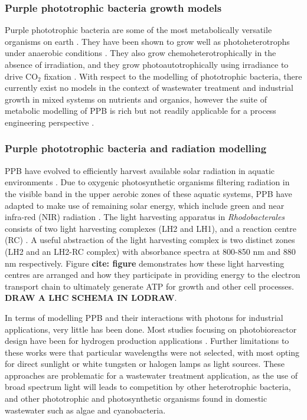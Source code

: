 \subsubsection{Purple phototrophic bacteria growth models}
Purple phototrophic bacteria are some of the most metabolically versatile organisms on earth \cite{Hunter2008}. They have been shown to grow well as photoheterotrophs under anaerobic conditions \cite{Hulsen2014}. They also grow chemoheterotrophically in the absence of irradiation, and they grow photoautotrophically using irradiance to drive $\mathrm{CO_2}$ fixation \cite{Gordon2014}. With respect to the modelling of phototrophic bacteria, there currently exist no models in the context of wastewater treatment and industrial growth in mixed systems on nutrients and organics, however the suite of metabolic modelling of PPB is rich but not readily applicable for a process engineering perspective \cite{Klamt2002}.

\subsubsection{Purple phototrophic bacteria and radiation modelling}
PPB have evolved to efficiently harvest available solar radiation in aquatic environments \cite{Cogdell2006a}. Due to oxygenic photosynthetic organisms filtering radiation in the visible band in the upper aerobic zones of these aquatic systems, PPB have adapted to make use of remaining solar energy, which include green and near infra-red (NIR) radiation \cite{Cogdell2006a}. The light harvesting apparatus in \textit{Rhodobacterales} consists of two light harvesting complexes (LH2 and LH1), and a reaction centre (RC) \cite{Hellingwerf1994}. A useful abstraction of the light harvesting complex is two distinct zones (LH2 and an LH2-RC complex) with absorbance spectra at 800-850 \si{nm} and 880 \si{nm} respectively. Figure \textbf{cite: figure} demonstrates how these light harvesting centres are arranged and how they participate in providing energy to the electron transport chain to ultimately generate ATP for growth and other cell processes. \textbf{DRAW A LHC SCHEMA IN LODRAW}.

In terms of modelling PPB and their interactions with photons for industrial applications, very little has been done. Most studies focusing on photobioreactor design have been for hydrogen production applications \cite{Adessi2014, Krujatz2015}. Further limitations to these works were that particular wavelengths were not selected, with most opting for direct sunlight or white tungsten or halogen lamps as light sources. These approaches are problematic for a wastewater treatment application, as the use of broad spectrum light will leads to competition by other heterotrophic bacteria, and other phototrophic and photosynthetic organisms found in domestic wastewater such as algae and cyanobacteria.

